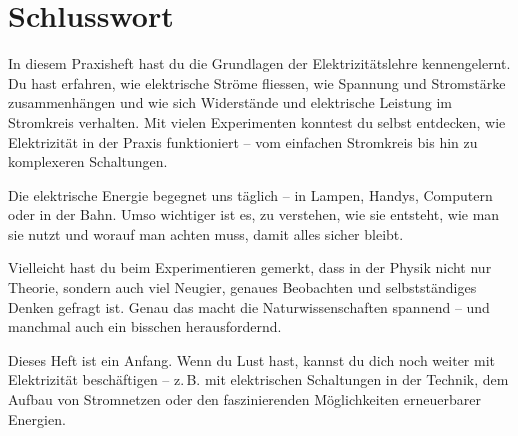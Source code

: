 \newpage
\chapter{Schlusswort}

In diesem Praxisheft hast du die Grundlagen der Elektrizitätslehre kennengelernt.
Du hast erfahren, wie elektrische Ströme fliessen, wie Spannung und Stromstärke
zusammenhängen und wie sich Widerstände und elektrische Leistung im Stromkreis verhalten.
Mit vielen Experimenten konntest du selbst entdecken, wie Elektrizität in der Praxis
funktioniert – vom einfachen Stromkreis bis hin zu komplexeren Schaltungen.

Die elektrische Energie begegnet uns täglich – in Lampen, Handys, Computern
oder in der Bahn. Umso wichtiger ist es, zu verstehen, wie sie entsteht,
wie man sie nutzt und worauf man achten muss, damit alles sicher bleibt.

Vielleicht hast du beim Experimentieren gemerkt, dass in der Physik nicht
nur Theorie, sondern auch viel Neugier, genaues Beobachten und selbstständiges
Denken gefragt ist. Genau das macht die Naturwissenschaften spannend – und manchmal
auch ein bisschen herausfordernd.

Dieses Heft ist ein Anfang. Wenn du Lust hast, kannst du dich noch weiter mit
Elektrizität beschäftigen – z. B. mit elektrischen Schaltungen in der Technik,
dem Aufbau von Stromnetzen oder den faszinierenden Möglichkeiten erneuerbarer Energien.
